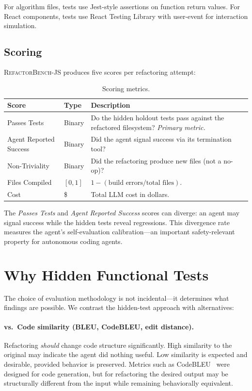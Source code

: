 \documentclass[11pt,letterpaper]{article}
\begin{document}
For algorithm files, tests use Jest-style assertions on function return values. For React components, tests use React Testing Library with user-event for interaction simulation.

\subsection{Scoring}

\textsc{RefactorBench}-JS produces five scores per refactoring attempt:

\begin{table}[ht]
\centering
\caption{Scoring metrics.}
\label{tab:scores}
\small
\begin{tabularx}{\textwidth}{llX}
\toprule
\textbf{Score} & \textbf{Type} & \textbf{Description} \\
\midrule
Passes Tests & Binary & Do the hidden holdout tests pass against the refactored filesystem? \emph{Primary metric.} \\
Agent Reported Success & Binary & Did the agent signal success via its termination tool? \\
Non-Triviality & Binary & Did the refactoring produce new files (not a no-op)? \\
Files Compiled & $[0,1]$ & $1 - (\text{build errors} / \text{total files})$. \\
Cost & \$ & Total LLM cost in dollars. \\
\bottomrule
\end{tabularx}
\end{table}

The \emph{Passes Tests} and \emph{Agent Reported Success} scores can diverge: an agent may signal success while the hidden tests reveal regressions. This divergence rate measures the agent's self-evaluation calibration---an important safety-relevant property for autonomous coding agents.

\section{Why Hidden Functional Tests}
\label{sec:why-hidden}

The choice of evaluation methodology is not incidental---it determines what findings are possible. We contrast the hidden-test approach with alternatives:

\paragraph{vs.\ Code similarity (BLEU, CodeBLEU, edit distance).} Refactoring \emph{should} change code structure significantly. High similarity to the original may indicate the agent did nothing useful. Low similarity is expected and desirable, provided behavior is preserved. Metrics such as CodeBLEU~\citep{ren2020codebleu} were designed for code generation, but for refactoring the desired output may be structurally different from the input while remaining behaviorally equivalent.
\end{document}
